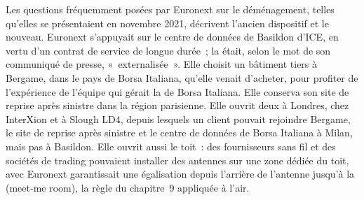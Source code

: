 Les questions fréquemment posées par Euronext sur le déménagement, telles qu'elles se présentaient en novembre 2021, décrivent l'ancien dispositif et le nouveau. Euronext
s'appuyait sur le centre de données de Basildon d'ICE, en vertu d'un contrat de service de longue durée~; la  était, selon le mot de son communiqué de presse, «~externalisée~».
Elle choisit un bâtiment tiers à Bergame, dans le pays de Borsa Italiana, qu'elle venait d'acheter, pour profiter de l'expérience de l'équipe
qui gérait la  de Borsa Italiana. Elle conserva son site de reprise après sinistre dans la région parisienne. Elle ouvrit deux  à Londres, chez
InterXion et à Slough LD4, depuis lesquels un client pouvait rejoindre Bergame, le site de reprise après sinistre et le centre de données de Borsa Italiana à Milan,
mais pas à Basildon. Elle ouvrit aussi le toit~: des fournisseurs sans fil et des sociétés de trading pouvaient installer des antennes sur une zone dédiée du toit, avec
Euronext garantissait une égalisation depuis l'arrière de l'antenne jusqu'à la  (meet-me room), la règle du chapitre~9 appliquée à l'air.

